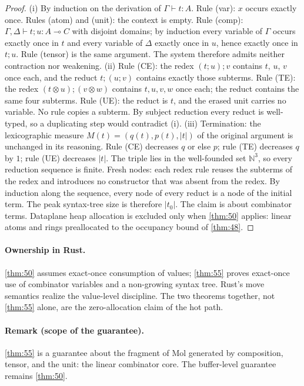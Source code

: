 \begin{proof}
(i) By induction on the derivation of $\Gamma \vdash t : A$. Rule (var): $x$ occurs exactly once. Rules (atom) and (unit): the context is empty. Rule (comp): $\Gamma, \Delta \vdash t ; u : A \multimap C$ with disjoint domains; by induction every variable of $\Gamma$ occurs exactly once in $t$ and every variable of $\Delta$ exactly once in $u$, hence exactly once in $t ; u$. Rule (tensor) is the same argument. The system therefore admits neither contraction nor weakening.
(ii) Rule (CE): the redex $(t ; u) ; v$ contains $t$, $u$, $v$ once each, and the reduct $t ; (u ; v)$ contains exactly those subterms. Rule (TE): the redex $(t \otimes u) ; (v \otimes w)$ contains $t, u, v, w$ once each; the reduct contains the same four subterms. Rule (UE): the reduct is $t$, and the erased unit carries no variable. No rule copies a subterm. By subject reduction every reduct is well-typed, so a duplicating step would contradict (i).
(iii) Termination: the lexicographic measure $M (t) = (q (t), p (t), |t|)$ of the original argument is unchanged in its reasoning. Rule (CE) decreases $q$ or else $p$; rule (TE) decreases $q$ by $1$; rule (UE) decreases $|t|$. The triple lies in the well-founded set $\mathbb{N}^{3}$, so every reduction sequence is finite. Fresh nodes: each redex rule reuses the subterms of the redex and introduces no constructor that was absent from the redex. By induction along the sequence, every node of every reduct is a node of the initial term. The peak syntax-tree size is therefore $|t_0|$. The claim is about combinator terms. Dataplane heap allocation is excluded only when \autoref{thm:50} applies: linear atoms and rings preallocated to the occupancy bound of \autoref{thm:48}.
\end{proof}

\paragraph{Ownership in Rust.}
\autoref{thm:50} assumes exact-once consumption of values; \autoref{thm:55} proves exact-once use of combinator variables and a non-growing syntax tree. Rust's move semantics realize the value-level discipline. The two theorems together, not \autoref{thm:55} alone, are the zero-allocation claim of the hot path.

\paragraph{Remark (scope of the guarantee).}
\autoref{thm:55} is a guarantee about the fragment of Mol generated by composition, tensor, and the unit: the linear combinator core. The buffer-level guarantee remains \autoref{thm:50}.
